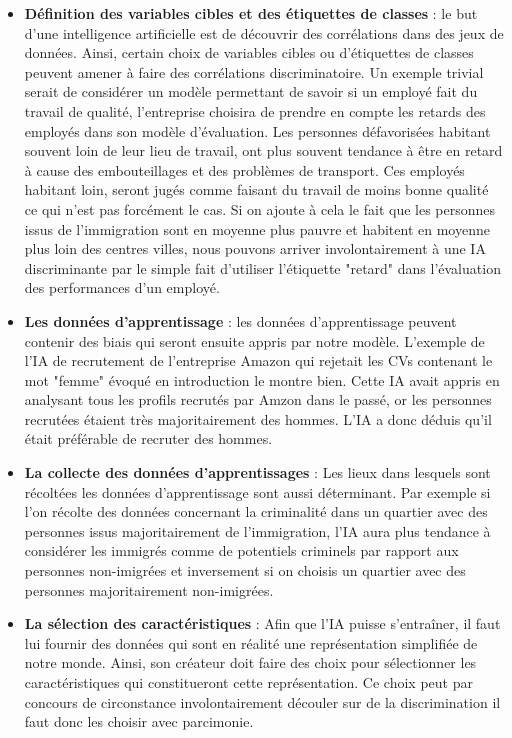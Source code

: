\begin{itemize}
    \item \textbf{Définition des variables cibles et des étiquettes de classes} : le but d'une intelligence artificielle est de découvrir des corrélations dans des jeux de données. Ainsi, certain choix de variables cibles ou d'étiquettes de classes peuvent amener à faire des corrélations discriminatoire. Un exemple trivial serait de considérer un modèle permettant de savoir si un employé fait du travail de qualité, l'entreprise choisira de prendre en compte les retards des employés dans son modèle d'évaluation. Les personnes défavorisées habitant souvent loin de leur lieu de travail, ont plus souvent tendance à être en retard à cause des embouteillages et des problèmes de transport. Ces employés habitant loin, seront jugés comme faisant du travail de moins bonne qualité ce qui n'est pas forcément le cas. Si on ajoute à cela le fait que les personnes issus de l'immigration sont en moyenne plus pauvre et habitent en moyenne plus loin des centres villes, nous pouvons arriver involontairement à une IA discriminante par le simple fait d'utiliser l'étiquette "retard" dans l'évaluation des performances d'un employé.
    \item \textbf{Les données d'apprentissage} : les données d'apprentissage peuvent contenir des biais qui seront ensuite appris par notre modèle. L'exemple de l'IA de recrutement de l'entreprise Amazon qui rejetait les CVs contenant le mot "femme" évoqué en introduction le montre bien. Cette IA avait appris en analysant tous les profils recrutés par Amzon dans le passé, or les personnes recrutées étaient très majoritairement des hommes. L'IA a donc déduis qu'il était préférable de recruter des hommes. 
    \item \textbf{La collecte des données d'apprentissages} : Les lieux dans lesquels sont récoltées les données d'apprentissage sont aussi déterminant. Par exemple si l'on récolte des données concernant la criminalité dans un quartier avec des personnes issus majoritairement de l'immigration, l'IA aura plus tendance à considérer les immigrés comme de potentiels criminels par rapport aux personnes non-imigrées et inversement si on choisis un quartier avec des personnes majoritairement non-imigrées.
    \item \textbf{La sélection des caractéristiques} : Afin que l'IA puisse s'entraîner, il faut lui fournir des données qui sont en réalité une représentation simplifiée de notre monde. Ainsi, son créateur doit faire des choix pour sélectionner les caractéristiques qui constitueront cette représentation. Ce choix peut par concours de circonstance involontairement découler sur de la discrimination il faut donc les choisir avec parcimonie.

\end{itemize}

